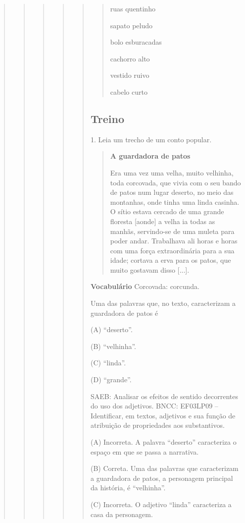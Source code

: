 \begin{quote}
\begin{quote}
\begin{quote}
\begin{quote}
\begin{quote}
\begin{quote}
ruas quentinho

sapato peludo

bolo esburacadas

cachorro alto

vestido ruivo

cabelo curto
\end{quote}

\subsection{Treino}\label{treino-6}

1. Leia um trecho de um conto popular.

\begin{quote}
\textbf{A guardadora de patos}

Era uma vez uma velha, muito velhinha, toda corcovada, que vivia com o
seu bando de patos num lugar deserto, no meio das montanhas, onde tinha
uma linda casinha. O sítio estava cercado de uma grande floresta [aonde] a
velha ia todas as manhãs, servindo-se de uma muleta para poder andar.
Trabalhava ali horas e horas com uma força extraordinária para a sua
idade; cortava a erva para os patos, que muito gostavam disso
{[}...{]}.

\end{quote}

\textbf{Vocabulário}
Corcovada: corcunda.

Uma das palavras que, no texto, caracterizam a guardadora de
patos é

(A) ``deserto''.

(B) ``velhinha''.

(C) ``linda''.

(D) ``grande''.

SAEB: Analisar os efeitos de sentido decorrentes do uso dos adjetivos.
BNCC: EF03LP09 -- Identificar, em textos, adjetivos e sua função de
atribuição de propriedades aos substantivos.

(A) Incorreta. A palavra ``deserto'' caracteriza o espaço em que se
passa a narrativa.

(B) Correta. Uma das palavras que caracterizam a
guardadora de patos, a personagem principal da história, é ``velhinha''.

(C) Incorreta. O adjetivo ``linda'' caracteriza a casa da personagem.


\end{quote}
\end{quote}
\end{quote}
\end{quote}
\end{quote}
